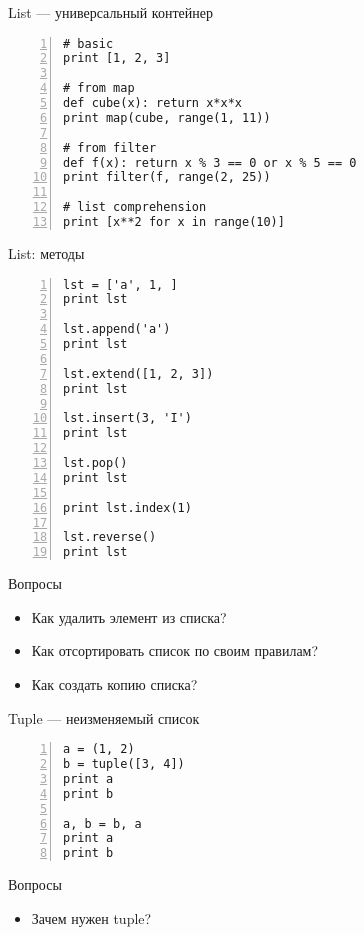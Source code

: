 \documentclass[hyperref={pdftex,unicode}]{beamer}
\begin{document}
\begin{frame}[fragile]{List --- универсальный контейнер}
  \begin{lstlisting}[basicstyle=\footnotesize\ttfamily,numbers=left]
# basic
print [1, 2, 3]

# from map
def cube(x): return x*x*x
print map(cube, range(1, 11))

# from filter
def f(x): return x % 3 == 0 or x % 5 == 0
print filter(f, range(2, 25))

# list comprehension
print [x**2 for x in range(10)]
\end{lstlisting}
\end{frame}

\begin{frame}[fragile]{List: методы}
  \begin{lstlisting}[basicstyle=\footnotesize\ttfamily,numbers=left]
lst = ['a', 1, ]
print lst

lst.append('a')
print lst

lst.extend([1, 2, 3])
print lst

lst.insert(3, 'I')
print lst

lst.pop()
print lst

print lst.index(1)

lst.reverse()
print lst
  \end{lstlisting}
\end{frame}

\begin{frame}{Вопросы}
  \begin{itemize}
  \item Как удалить элемент из списка?
  \item Как отсортировать список по своим правилам?
  \item Как создать копию списка?
  \end{itemize}
\end{frame}

\begin{frame}[fragile]{Tuple --- неизменяемый список}
  \begin{lstlisting}[basicstyle=\footnotesize\ttfamily,numbers=left]
a = (1, 2)
b = tuple([3, 4])
print a
print b

a, b = b, a
print a
print b
  \end{lstlisting}
\end{frame}

\begin{frame}{Вопросы}
  \begin{itemize}
  \item Зачем нужен tuple?
  \end{itemize}
\end{frame}
\end{document}
